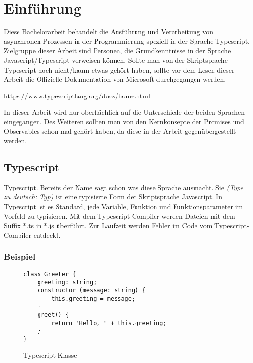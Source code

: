 \setcounter{secnumdepth}{1}
\section{Einführung}
Diese Bachelorarbeit behandelt die Ausführung und Verarbeitung von asynchronen Prozessen in der Programmierung speziell in der Sprache Typescript.\\
Zielgruppe dieser Arbeit sind Personen, die Grundkenntnisse in der Sprache Javascript/Typescript vorweisen können.
Sollte man von der Skriptsprache Typescript noch nicht/kaum etwas gehört haben, sollte vor dem Lesen dieser Arbeit die Offizielle Dokumentation von Microsoft durchgegangen werden.

\begin{center}
\url{https://www.typescriptlang.org/docs/home.html}
\end{center}

In dieser Arbeit wird nur oberflächlich auf die Unterschiede der beiden Sprachen eingegangen. Des Weiteren sollten man von den  Kernkonzepte der Promises und Observables schon mal gehört haben, da diese in der Arbeit gegenübergestellt werden.

\subsection{Typescript}
Typescript. Bereits der Name sagt schon was diese Sprache ausmacht. Sie \textit{(\glqq{}Type\grqq{} zu deutsch: Typ)} ist eine typisierte Form der Skriptsprache Javascript. In Typescript ist es Standard, jede Variable, Funktion und Funktionsparameter im Vorfeld zu typisieren. Mit dem Typescript Compiler werden Dateien mit dem Suffix *.ts in *.js überführt. Zur Laufzeit werden Fehler im Code vom Typescript-Compiler entdeckt.

\subsubsection{Beispiel}

\begin{figure}[ht!]
\begin{lstlisting}
class Greeter {
    greeting: string;
    constructor (message: string) {
        this.greeting = message;
    }
    greet() {
        return "Hello, " + this.greeting;
    }
}  
\end{lstlisting}
\caption{Typescript Klasse \cite{typescript-example}}
\end{figure}

